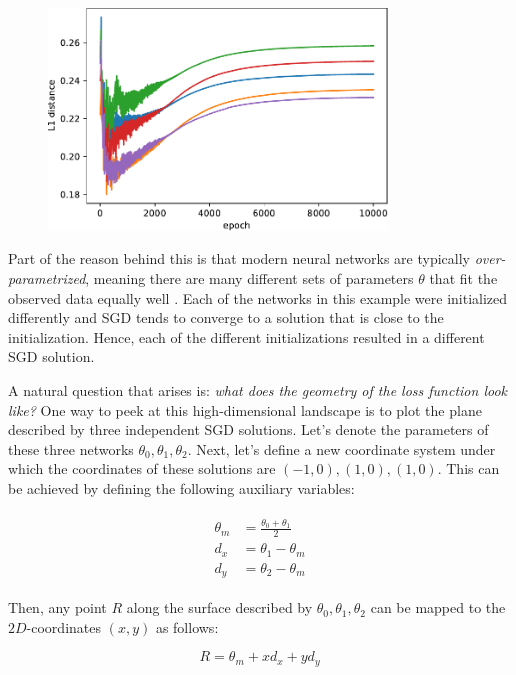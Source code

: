 \documentclass[12pt]{article}
\begin{document}
\begin{figure}[H]
\centering
\includegraphics[width=9cm]{plots/1d_ens_param_distance.pdf}
\caption{}
\label{fig_1d_ens_param_distance}
\end{figure}

Part of the reason behind this is that modern neural networks are typically \textit{over-parametrized}, meaning there are many different sets of parameters $\theta$ that fit the observed data equally well \cite{underspecification, deep_ens, mode_connectivity}. Each of the networks in this example were initialized differently and SGD tends to converge to a solution that is close to the initialization. Hence, each of the different initializations resulted in a different SGD solution.

A natural question that arises is: \textit{what does the geometry of the loss function look like?} One way to peek at this high-dimensional landscape is to plot the plane described by three independent SGD solutions. Let's denote the parameters of these three networks $\theta_0, \theta_1, \theta_2$. Next, let's define a new coordinate system under which the coordinates of these solutions are $(-1, 0), (1, 0), (1, 0)$. This can be achieved by defining the following auxiliary variables:

\begin{align}
\begin{split}
\theta_m &= \frac{\theta_0 + \theta_1}{2} \\
d_x &= \theta_1 - \theta_m \\
d_y &= \theta_2 - \theta_m
\end{split}
\end{align}

Then, any point $R$ along the surface described by $\theta_0, \theta_1, \theta_2$ can be mapped to the $2D$-coordinates $(x, y)$ as follows:

\begin{equation}
R = \theta_m + x d_x + y d_y
\end{equation}
\end{document}
